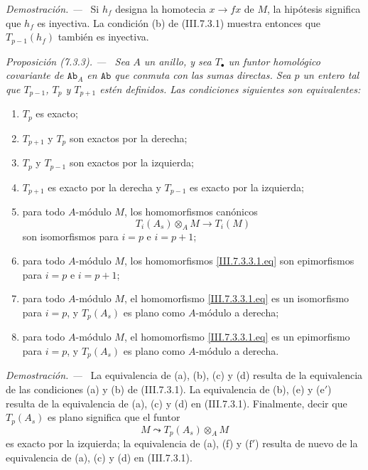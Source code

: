 \documentclass[10pt,oneside]{book}
\newcommand{\cat}[1]{\mathtt{#1}}
\newcommand{\sref}[2][]{\textup{(#2)}}
\newenvironment{proposition}[1][]{\par\medskip\noindent\itshape Proposición (#1). ---\ }{\par}
\newenvironment{proof}{\par\medskip\noindent\textit{Demostración. ---\ }}{\par}
\begin{document}
\begin{proof}
Si $h_f$ designa la homotecia $x\to fx$ de $M$, la hipótesis
significa que $h_f$ es inyectiva. La condición (b) de
\sref{III.7.3.1} muestra entonces que $T_{p-1}(h_f)$ también es
inyectiva.
\end{proof}

\begin{proposition}[7.3.3]
\label{III.7.3.3}
Sea $A$ un anillo, y sea $T_\bullet$ un funtor homológico
covariante de $\cat{Ab}_A$ en $\cat{Ab}$ que conmuta con las
sumas directas. Sea $p$ un entero tal que $T_{p-1}$, $T_p$ y
$T_{p+1}$ estén definidos. Las condiciones siguientes son
equivalentes:
\begin{enumerate}
  \item[(a)] $T_p$ es exacto;
  \item[(b)] $T_{p+1}$ y $T_p$ son exactos por la derecha;
  \item[(c)] $T_p$ y $T_{p-1}$ son exactos por la izquierda;
  \item[(d)] $T_{p+1}$ es exacto por la derecha y $T_{p-1}$ es
    exacto por la izquierda;
  \item[(e)] para todo $A$-módulo $M$, los homomorfismos canónicos
    \[
      T_i(A_s)\otimes_A M
      \longrightarrow
      T_i(M)
      \tag{7.3.3.1}\label{III.7.3.3.1.eq}
    \]
    son isomorfismos para $i=p$ e $i=p+1$;
  \item[($\mathrm{e}'$)] para todo $A$-módulo $M$, los
    homomorfismos \eqref{III.7.3.3.1.eq} son epimorfismos para
    $i=p$ e $i=p+1$;
  \item[(f)] para todo $A$-módulo $M$, el homomorfismo
    \eqref{III.7.3.3.1.eq} es un isomorfismo para $i=p$, y
    $T_p(A_s)$ es plano como $A$-módulo a derecha;
  \item[($\mathrm{f}'$)] para todo $A$-módulo $M$, el
    homomorfismo \eqref{III.7.3.3.1.eq} es un epimorfismo para
    $i=p$, y $T_p(A_s)$ es plano como $A$-módulo a derecha.
\end{enumerate}
\end{proposition}

\begin{proof}
La equivalencia de (a), (b), (c) y (d) resulta de la equivalencia
de las condiciones (a) y (b) de \sref{III.7.3.1}. La equivalencia
de (b), (e) y ($\mathrm{e}'$) resulta de la equivalencia de (a),
(c) y (d) en \sref{III.7.3.1}. Finalmente, decir que $T_p(A_s)$
es plano significa que el funtor
\[
  M\leadsto T_p(A_s)\otimes_A M
\]
es exacto por la izquierda; la equivalencia de (a), (f) y
($\mathrm{f}'$) resulta de nuevo de la equivalencia de (a), (c) y
(d) en \sref{III.7.3.1}.
\end{proof}
\end{document}
